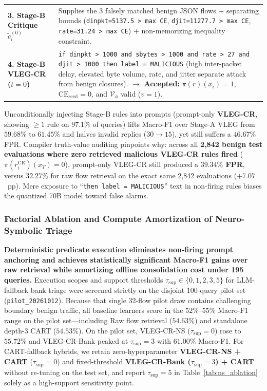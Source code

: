 \documentclass[11pt,letterpaper,onecolumn]{article}
\begin{document}
\begin{table}[tbp]
\begin{tabularx}{0.98\textwidth}{@{}p{3.0cm}X@{}}
\textbf{3. Stage-B Critique $\tilde{c}_i^{(0)}$} & Supplies the 3 falsely matched benign JSON flows + separating bounds (\texttt{dinpkt=5137.5 > max CE}, \texttt{djit=11277.7 > max CE}, \texttt{rate=31.24 > max CE}) + non-memorizing inequality constraint. \\
\textbf{4. Stage-B VLEG-CR ($t=0$)} & \texttt{if dinpkt > 1000 and sbytes > 1000 and rate > 27 and djit > 1000 then label = MALICIOUS} (high inter-packet delay, elevated byte volume, rate, and jitter separate attack from benign closures). $\rightarrow$ \textbf{Accepted:} $\pi(r)(x_i)=1$, $\mathrm{CE}_{\mathrm{seed}} = 0$, and $\mathcal{V}_\phi$ valid ($v=1$). \\
\bottomrule
\end{tabularx}
\end{table}

Unconditionally injecting Stage-B rules into prompts (prompt-only \textbf{VLEG-CR}, showing $\ge 1$ rule on $97.1\%$ of queries) lifts Macro-F1 over Stage-A VLEG from $59.68\%$ to $61.45\%$ and halves invalid replies ($30 \to 15$), yet still suffers a $46.67\%$ FPR. Compiler truth-value auditing pinpoints why: across all \textbf{2,842 benign test evaluations where zero retrieved malicious VLEG-CR rules fired} ($\pi(r_i^{\mathrm{CR}})(x_T)=0$), prompt-only VLEG-CR still produced a \textbf{$39.34\%$ FPR}, versus \textbf{$32.27\%$} for raw flow retrieval on the exact same 2,842 evaluations ($+7.07$~pp). Mere exposure to ``\texttt{then label = MALICIOUS}'' text in non-firing rules biases the quantized 70B model toward false alarms.

\subsubsection{Factorial Ablation and Compute Amortization of Neuro-Symbolic Triage}
\textbf{Deterministic predicate execution eliminates non-firing prompt anchoring and achieves statistically significant Macro-F1 gains over raw retrieval while amortizing offline consolidation cost under 195 queries.} Execution scopes and support thresholds $\tau_{\mathrm{sup}} \in \{0,1,2,3,5\}$ for LLM-fallback bank triage were screened strictly on the disjoint 100-query pilot set (\texttt{pilot\_20261012}). Because that single 32-flow pilot draw contains challenging boundary benign traffic, all baseline learners score in the $52\%$--$55\%$ Macro-F1 range on the pilot set---including Raw flow retrieval ($54.63\%$) and standalone depth-3 CART ($54.53\%$). On the pilot set, VLEG-CR-NS ($\tau_{\mathrm{sup}}=0$) rose to $55.72\%$ and VLEG-CR-Bank peaked at $\tau_{\mathrm{sup}}=3$ with $61.00\%$ Macro-F1. For CART-fallback hybrids, we retain zero-hyperparameter \textbf{VLEG-CR-NS + CART} ($\tau_{\mathrm{sup}}=0$) and fixed-threshold \textbf{VLEG-CR-Bank ($\tau_{\mathrm{sup}}=3$) + CART} without re-tuning on the test set, and report $\tau_{\mathrm{sup}}=5$ in Table~\ref{tab:ns_ablation} solely as a high-support sensitivity point.
\end{document}
